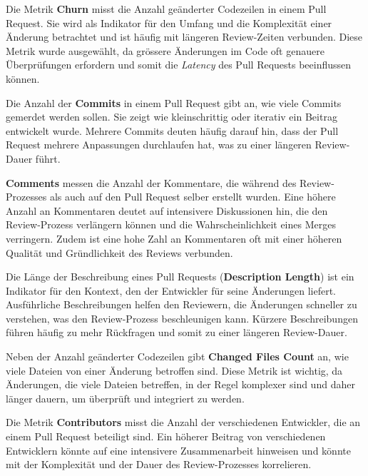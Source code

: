 Die Metrik \textbf{Churn} misst die Anzahl geänderter Codezeilen in einem Pull Request. Sie wird als Indikator für den Umfang und die Komplexität einer Änderung betrachtet und ist häufig mit längeren Review-Zeiten verbunden. Diese Metrik wurde ausgewählt, da grössere Änderungen im Code oft genauere Überprüfungen erfordern und somit die \textit{Latency} des Pull Requests beeinflussen können. \parencite{gousios_exploratory_2014}

Die Anzahl der \textbf{Commits} in einem Pull Request gibt an, wie viele Commits gemerdet werden sollen. Sie zeigt wie kleinschrittig oder iterativ ein Beitrag entwickelt wurde. Mehrere Commits deuten häufig darauf hin, dass der Pull Request mehrere Anpassungen durchlaufen hat, was zu einer längeren Review-Dauer führt. \parencite{zhang_pull_2022}

\textbf{Comments} messen die Anzahl der Kommentare, die während des Review-Prozesses als auch auf den Pull Request selber erstellt wurden. Eine höhere Anzahl an Kommentaren deutet auf intensivere Diskussionen hin, die den Review-Prozess verlängern können und die Wahrscheinlichkeit eines Merges verringern. Zudem ist eine hohe Zahl an Kommentaren oft mit einer höheren Qualität und Gründlichkeit des Reviews verbunden. \parencite{tsay_influence_2014}

Die Länge der Beschreibung eines Pull Requests (\textbf{Description Length}) ist ein Indikator für den Kontext, den der Entwickler für seine Änderungen liefert. Ausführliche Beschreibungen helfen den Reviewern, die Änderungen schneller zu verstehen, was den Review-Prozess beschleunigen kann. Kürzere Beschreibungen führen häufig zu mehr Rückfragen und somit zu einer längeren Review-Dauer. \parencite{zhang_pull_2022}

Neben der Anzahl geänderter Codezeilen gibt \textbf{Changed Files Count} an, wie viele Dateien von einer Änderung betroffen sind. Diese Metrik ist wichtig, da Änderungen, die viele Dateien betreffen, in der Regel komplexer sind und daher länger dauern, um überprüft und integriert zu werden. \parencite{tsay_influence_2014}

Die Metrik \textbf{Contributors} misst die Anzahl der verschiedenen Entwickler, die an einem Pull Request beteiligt sind. Ein höherer Beitrag von verschiedenen Entwicklern könnte auf eine intensivere Zusammenarbeit hinweisen und könnte mit der Komplexität und der Dauer des Review-Prozesses korrelieren.

